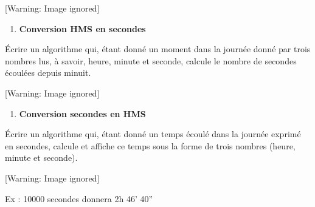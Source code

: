 \begin{center}
 [Warning: Image ignored] %

\end{center}
\liststyleExercice
\setcounter{saveenum}{\value{enumi}}
\begin{enumerate}
\setcounter{enumi}{\value{saveenum}}
\item {\sffamily\bfseries
Conversion HMS en secondes}
\end{enumerate}
{
Écrire un algorithme qui, étant donné un moment dans la journée donné
par trois nombres lus, à savoir, heure, minute et seconde, calcule le
nombre de secondes écoulées depuis minuit.}

\begin{center}
 [Warning: Image ignored] %

\end{center}
\liststyleExercice
\setcounter{saveenum}{\value{enumi}}
\begin{enumerate}
\setcounter{enumi}{\value{saveenum}}
\item {\sffamily\bfseries
Conversion secondes en HMS}
\end{enumerate}
{
Écrire un algorithme qui, étant donné un temps écoulé dans la journée
exprimé en secondes, calcule et affiche ce temps sous la forme de trois
nombres (heure, minute et seconde).}

\begin{center}
 [Warning: Image ignored] %

\end{center}
{
Ex : 10000 secondes donnera 2h 46'
40''}


\bigskip

